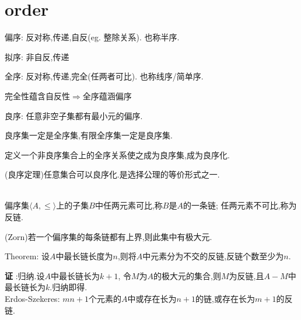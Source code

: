 \section{order}
偏序:
反对称,传递,自反(eg. 整除关系).
也称半序.

拟序:
非自反,传递

全序:
反对称,传递,完全(任两者可比).
也称线序/简单序.

完全性蕴含自反性$ \Rightarrow $全序蕴涵偏序

良序:
任意非空子集都有最小元的偏序.

良序集一定是全序集,有限全序集一定是良序集.

定义一个非良序集合上的全序关系使之成为良序集,成为良序化.

(良序定理)任意集合可以良序化.是选择公理的等价形式之一.

\\


偏序集$ \langle A,\le \rangle$上的子集$ B$中任两元素可比,称$ B$是$ A$的一条链;
任两元素不可比,称为反链.

(Zorn)若一个偏序集的每条链都有上界,则此集中有极大元.

Theorem:
设$ A$中最长链长度为$ n$,则将$ A$中元素分为不交的反链,反链个数至少为$ n$.

{\bf 证 }:归纳.设$ A$中最长链长为$ k+1$,
令$ M$为$ A$的极大元的集合,则$ M$为反链,且$ A-M$中最长链长为$ k$.归纳即得.
\\

Erdos-Szekeres:
$ mn+1$个元素的$ A$中或存在长为$ n+1$的链,或存在长为$ m+1$的反链.

